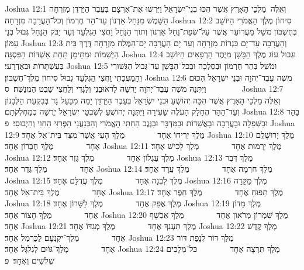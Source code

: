 Joshua 12:1	וְאֵלֶּה  מַלְכֵי הָאָרֶץ אֲשֶׁר הִכּוּ בְנֵי־יִשְׂרָאֵל וַיִּרְשׁוּ אֶת־אַרְצָם בְּעֵבֶר הַיַּרְדֵּן מִזְרְחָה הַשָּׁמֶשׁ מִנַּחַל אַרְנוֹן עַד־הַר חֶרְמוֹן וְכל־הָעֲרָבָה מִזְרָחָה׃
Joshua 12:2	סִיחוֹן מֶלֶךְ הָאֱמֹרִי הַיּוֹשֵׁב בְּחֶשְׁבּוֹן מֹשֵׁל מֵעֲרוֹעֵר אֲשֶׁר עַל־שְׂפַת־נַחַל אַרְנוֹן וְתוֹךְ הַנַּחַל וַחֲצִי הַגִּלְעָד וְעַד יַבֹּק הַנַּחַל גְּבוּל בְּנֵי עַמּוֹן׃
Joshua 12:3	וְהָעֲרָבָה עַד־יָם כִּנְרוֹת מִזְרָחָה וְעַד יָם הָעֲרָבָה יָם־הַמֶּלַח מִזְרָחָה דֶּרֶךְ בֵּית הַיְשִׁמוֹת וּמִתֵּימָן תַּחַת אַשְׁדּוֹת הַפִּסְגָּה׃
Joshua 12:4	וּגְבוּל עוֹג מֶלֶךְ הַבָּשָׁן מִיֶּתֶר הָרְפָאִים הַיּוֹשֵׁב בְּעַשְׁתָּרוֹת וּבְאֶדְרֶעִי׃
Joshua 12:5	וּמֹשֵׁל בְּהַר חֶרְמוֹן וּבְסַלְכָה וּבְכל־הַבָּשָׁן עַד־גְּבוּל הַגְּשׁוּרִי וְהַמַּעֲכָתִי וַחֲצִי הַגִּלְעָד גְּבוּל סִיחוֹן מֶלֶךְ־חֶשְׁבּוֹן׃
Joshua 12:6	מֹשֶׁה עֶבֶד־יְהֹוָה וּבְנֵי יִשְׂרָאֵל הִכּוּם וַיִּתְּנָהּ מֹשֶׁה עֶבֶד־יְהֹוָה יְרֻשָּׁה לָראוּבֵנִי וְלַגָּדִי וְלַחֲצִי שֵׁבֶט הַמְנַשֶּׁה׃ {ס}        
Joshua 12:7	וְאֵלֶּה מַלְכֵי הָאָרֶץ אֲשֶׁר הִכָּה יְהוֹשֻׁעַ וּבְנֵי יִשְׂרָאֵל בְּעֵבֶר הַיַּרְדֵּן יָמָּה מִבַּעַל גָּד בְּבִקְעַת הַלְּבָנוֹן וְעַד־הָהָר הֶחָלָק הָעֹלֶה שֵׂעִירָה וַיִּתְּנָהּ יְהוֹשֻׁעַ לְשִׁבְטֵי יִשְׂרָאֵל יְרֻשָּׁה כְּמַחְלְקֹתָם׃
Joshua 12:8	בָּהָר וּבַשְּׁפֵלָה וּבָעֲרָבָה וּבָאֲשֵׁדוֹת וּבַמִּדְבָּר וּבַנֶּגֶב הַחִתִּי הָאֱמֹרִי וְהַכְּנַעֲנִי הַפְּרִזִּי הַחִוִּי וְהַיְבוּסִי׃ {פ}
Joshua 12:9	מֶלֶךְ יְרִיחוֹ אֶחָד        מֶלֶךְ הָעַי אֲשֶׁר־מִצַּד בֵּית־אֵל אֶחָד׃
Joshua 12:10	מֶלֶךְ יְרוּשָׁלַ͏ִם אֶחָד        מֶלֶךְ חֶבְרוֹן אֶחָד׃
Joshua 12:11	מֶלֶךְ יַרְמוּת אֶחָד        מֶלֶךְ לָכִישׁ אֶחָד׃
Joshua 12:12	מֶלֶךְ עֶגְלוֹן אֶחָד        מֶלֶךְ גֶּזֶר אֶחָד׃
Joshua 12:13	מֶלֶךְ דְּבִר אֶחָד        מֶלֶךְ גֶּדֶר אֶחָד׃
Joshua 12:14	מֶלֶךְ חרְמָה אֶחָד        מֶלֶךְ עֲרָד אֶחָד׃
Joshua 12:15	מֶלֶךְ לִבְנָה אֶחָד        מֶלֶךְ עֲדֻלָּם אֶחָד׃
Joshua 12:16	מֶלֶךְ מַקֵּדָה אֶחָד        מֶלֶךְ בֵּית־אֵל אֶחָד׃
Joshua 12:17	מֶלֶךְ תַּפּוּחַ אֶחָד        מֶלֶךְ חֵפֶר אֶחָד׃
Joshua 12:18	מֶלֶךְ אֲפֵק אֶחָד        מֶלֶךְ לַשָּׁרוֹן אֶחָד׃
Joshua 12:19	מֶלֶךְ מָדוֹן אֶחָד        מֶלֶךְ חָצוֹר אֶחָד׃
Joshua 12:20	מֶלֶךְ שִׁמְרוֹן מְרֹאון אֶחָד        מֶלֶךְ אַכְשָׁף אֶחָד׃
Joshua 12:21	מֶלֶךְ תַּעְנַךְ אֶחָד        מֶלֶךְ מְגִדּוֹ אֶחָד׃
Joshua 12:22	מֶלֶךְ קֶדֶשׁ אֶחָד        מֶלֶךְ־יקְנְעָם לַכַּרְמֶל אֶחָד׃
Joshua 12:23	מֶלֶךְ דּוֹר לְנָפַת דּוֹר אֶחָד        מֶלֶךְ־גּוֹיִם לְגִלְגָּל אֶחָד׃
Joshua 12:24	מֶלֶךְ תִּרְצָה אֶחָד        כּל־מְלָכִים שְׁלֹשִׁים וְאֶחָד׃ {פ}
